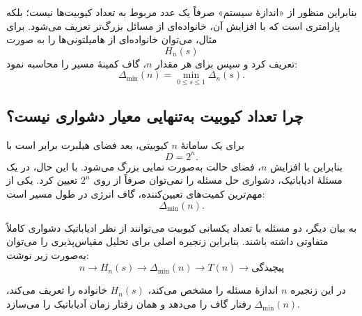 بنابراین منظور از «اندازهٔ سیستم» صرفاً یک عدد مربوط به تعداد کیوبیت‌ها نیست؛ بلکه پارامتری است که با افزایش آن، خانواده‌ای از مسائل بزرگ‌تر تعریف می‌شود. برای مثال، می‌توان خانواده‌ای از هامیلتونی‌ها را به صورت
\begin{equation}
	H_n(s)
\end{equation}
تعریف کرد و سپس برای هر مقدار $n$، گاف کمینهٔ مسیر را محاسبه نمود:
\begin{equation}
	\Delta_{\min}(n)=
	\min_{0\leq s\leq1}\Delta_n(s).
	\label{eq:gap-min-system-size}
\end{equation}

\subsection{چرا تعداد کیوبیت به‌تنهایی معیار دشواری نیست؟}

برای یک سامانهٔ $n$ کیوبیتی، بعد فضای هیلبرت برابر است با
\begin{equation}
	D=2^n.
\end{equation}
بنابراین با افزایش $n$، فضای حالت به‌صورت نمایی بزرگ می‌شود. با این حال، در یک مسئلهٔ ادیاباتیک، دشواری حل مسئله را نمی‌توان صرفاً از روی $2^n$ تعیین کرد. یکی از مهم‌ترین کمیت‌های تعیین‌کننده، گاف انرژی در طول مسیر است:
\begin{equation}
	\Delta_{\min}(n).
\end{equation}

به بیان دیگر، دو مسئله با تعداد یکسانی کیوبیت می‌توانند از نظر ادیاباتیک دشواری کاملاً متفاوتی داشته باشند. بنابراین زنجیره اصلی برای تحلیل مقیاس‌پذیری را می‌توان به‌صورت زیر نوشت:
\begin{equation}
	\boxed{
		n
		\longrightarrow
		H_n(s)
		\longrightarrow
		\Delta_{\min}(n)
		\longrightarrow
		T(n)
		\longrightarrow
		\text{پیچیدگی}
	}
\end{equation}

در این زنجیره $n$ اندازهٔ مسئله را مشخص می‌کند، $H_n(s)$ خانواده را تعریف می‌کند، $\Delta_{\min}(n)$ رفتار گاف را می‌دهد و همان رفتار زمان آدیاباتیک را می‌سازد.

